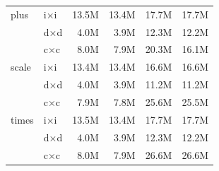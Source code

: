\begin{longtable}{l l r r r r}
  plus & i×i & 13.5M & 13.4M & 17.7M & 17.7M \\
   & d×d & 4.0M & 3.9M & 12.3M & 12.2M \\
   & c×c & 8.0M & 7.9M & 20.3M & 16.1M \\
\midrule
  scale & i×i & 13.4M & 13.4M & 16.6M & 16.6M \\
   & d×d & 4.0M & 3.9M & 11.2M & 11.2M \\
   & c×c & 7.9M & 7.8M & 25.6M & 25.5M \\
\midrule
  times & i×i & 13.5M & 13.4M & 17.7M & 17.7M \\
   & d×d & 4.0M & 3.9M & 12.3M & 12.2M \\
   & c×c & 8.0M & 7.9M & 26.6M & 26.6M \\
\midrule
\bottomrule
\end{longtable}
